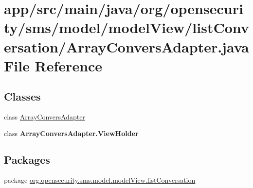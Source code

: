 \hypertarget{a00021}{\section{app/src/main/java/org/opensecurity/sms/model/model\+View/list\+Conversation/\+Array\+Convers\+Adapter.java File Reference}
\label{a00021}
}
\subsection*{Classes}
\begin{DoxyCompactItemize}
\item 
class \hyperlink{a00003}{Array\+Convers\+Adapter}
\item 
class {\bfseries Array\+Convers\+Adapter.\+View\+Holder}
\end{DoxyCompactItemize}
\subsection*{Packages}
\begin{DoxyCompactItemize}
\item 
package \hyperlink{a00038}{org.\+opensecurity.\+sms.\+model.\+model\+View.\+list\+Conversation}
\end{DoxyCompactItemize}
